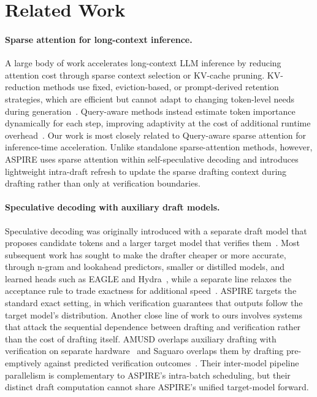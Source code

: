 \section{Related Work}
\paragraph{Sparse attention for long-context inference.}
A large body of work accelerates long-context LLM inference by reducing attention cost through sparse context selection or KV-cache pruning. KV-reduction methods use fixed, eviction-based, or prompt-derived retention strategies, which are efficient but cannot adapt to changing token-level needs during generation~\citep{xiao2024efficient, zhang2023h2o, li2024snapkv}. Query-aware methods instead estimate token importance dynamically for each step, improving adaptivity at the cost of additional runtime overhead~\citep{zarch-etal-2026-delta, tang2024quest, xiao2024infllm}. Our work is most closely related to Query-aware sparse attention for inference-time acceleration. Unlike standalone sparse-attention methods, however, ASPIRE uses sparse attention within self-speculative decoding and introduces lightweight intra-draft refresh to update the sparse drafting context during drafting rather than only at verification boundaries.

\paragraph{Speculative decoding with auxiliary draft models.}
Speculative decoding was originally introduced with a separate draft model that proposes candidate tokens and a larger target model that verifies them~\citep{leviathan2023fast, xia2023speculative}. Most subsequent work has sought to make the drafter cheaper or more accurate, through n-gram and lookahead predictors, smaller or distilled models, and learned heads such as EAGLE and Hydra~\citep{ou2024lossless, pmlr-v235-fu24a, zhou2024distillspec, li2024eagle, li2025eagle, ankner2024hydra}, while a separate line relaxes the acceptance rule to trade exactness for additional speed~\citep{kim2023speculative, cai2024medusa, bachmann2025judge, ziashahabi2025reject}. ASPIRE targets the standard exact setting, in which verification guarantees that outputs follow the target model's distribution. Another close line of work to ours involves systems that attack the sequential dependence between drafting and verification rather than the cost of drafting itself. AMUSD overlaps auxiliary drafting with verification on separate hardware~\citep{mcdanel2025amusd} and Saguaro overlaps them by drafting pre-emptively against predicted verification outcomes~\citep{kumar2026speculative}. Their inter-model pipeline parallelism is complementary to ASPIRE's intra-batch scheduling, but their distinct draft computation cannot share ASPIRE's unified target-model forward.

